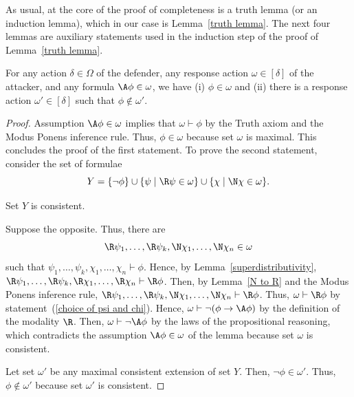 \documentclass[letterpaper]{article}
\begin{document}
As usual, at the core of the proof of completeness is a truth lemma (or an induction lemma), which in our case is Lemma~\ref{truth lemma}. The next four lemmas are auxiliary statements used in the induction step of the proof of Lemma~\ref{truth lemma}.

\begin{lemma}\label{A child exists}
For any action $\delta\in\Omega$ of the defender, any response action $\omega\in [\delta]$ of the attacker, and any formula $\A\phi\in \omega$, we have
(i) $\phi\in\omega$ and
(ii) there is a response action $\omega'\in[\delta]$ such that $\phi\notin\omega'$.  
\end{lemma}
\begin{proof}
Assumption $\A\phi\in \omega$ implies that $\omega\vdash\phi$ by the Truth axiom and the Modus Ponens inference rule. Thus, $\phi\in\omega$ because set $\omega$ is maximal. This concludes the proof of the first statement.
To prove the second statement, consider the set of formulae
\begin{equation}\label{Y definition}
    Y=\{\neg\phi\}\cup\{\psi\;|\;\R\psi\in\omega\}\cup\{\chi\;|\;\N\chi\in \omega\}.
\end{equation}
\begin{claim}
Set $Y$ is consistent.
\end{claim}
\begin{proof-of-claim}
Suppose the opposite. Thus, there are%
\begin{equation}\label{choice of psi and chi}
    \R\psi_1,\dots,\R\psi_k,\N\chi_1,\dots,\N\chi_n\in \omega
\end{equation}
such that
$
\psi_1,\dots,\psi_k,\chi_1,\dots,\chi_n\vdash \phi.
$
Hence, by Lemma~\ref{superdistributivity},
$
\R\psi_1,\dots,\R\psi_k,\R\chi_1,\dots,\R\chi_n\vdash \R\phi
$.
Then, by Lemma~\ref{N to R} and the Modus Ponens inference rule,
$
\R\psi_1,\dots,\R\psi_k,\N\chi_1,\dots,\N\chi_n\vdash \R\phi
$.
Thus, 
$
\omega\vdash \R\phi
$
by statement~(\ref{choice of psi and chi}).
Hence,
$
\omega\vdash \neg(\phi\to\A\phi)
$
by the definition of the modality $\R$. Then,
$
\omega\vdash \neg\A\phi
$
by the laws of the propositional reasoning, which contradicts the assumption $\A\phi\in \omega$ of the lemma because set $\omega$ is consistent. 
\end{proof-of-claim}
Let set $\omega'$ be any maximal consistent extension of set $Y$. Then, $\neg\phi\in \omega'$. Thus, $\phi\notin \omega'$ because set $\omega'$ is consistent.


\end{proof}
\end{document}
